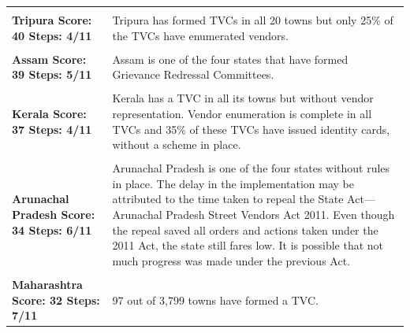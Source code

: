 \documentclass[a4paper, 12pt, twoside, table]{article}
\begin{document}
{\begin{longtable}[l]{>{\raggedright}p{3cm}>{\raggedright\arraybackslash}p{12cm}}
\cellcolor{SVACyellow1} & \cellcolor{SVACyellow2} \\

\cellcolor{SVACyellow1}\bf{Tripura}
\newline
\bf{Score: 40}
\newline
\bf{Steps: 4/11} & \cellcolor{SVACyellow2}Tripura has formed TVCs in all 20 towns but only 25\% of the TVCs have enumerated vendors. \\

\cellcolor{SVACyellow1} & \cellcolor{SVACyellow2} \\

\cellcolor{SVACyellow1}\bf{Assam}
\newline
\bf{Score: 39}
\newline
\bf{Steps: 5/11} & \cellcolor{SVACyellow2}Assam is one of the four states that have formed Grievance Redressal Committees. \\

\cellcolor{SVACyellow1} & \cellcolor{SVACyellow2} \\

\cellcolor{SVACyellow1}\bf{Kerala}
\newline
\bf{Score: 37}
\newline
\bf{Steps: 4/11} & \cellcolor{SVACyellow2}Kerala has a TVC in all its towns but without vendor representation. Vendor enumeration is complete in all TVCs and 35\% of these TVCs have issued identity cards, without a scheme in place. \\

\cellcolor{SVACyellow1} & \cellcolor{SVACyellow2} \\

\cellcolor{SVACyellow1}\bf{Arunachal Pradesh}
\newline
\bf{Score: 34}
\newline
\bf{Steps: 6/11} & \cellcolor{SVACyellow2}Arunachal Pradesh is one of the four states without rules in place. The delay in the implementation may be attributed to the time taken to repeal the State Act---Arunachal Pradesh Street Vendors Act 2011. Even though the repeal saved all orders and actions taken under the 2011 Act, the state still fares low. It is possible that not much progress was made under the previous Act. \\

\cellcolor{SVACyellow1} & \cellcolor{SVACyellow2} \\

\cellcolor{SVACyellow1}\bf{Maharashtra}
\newline
\bf{Score: 32}
\newline
\bf{Steps: 7/11} & \cellcolor{SVACyellow2}97 out of 3,799 towns have formed a TVC. \\


\end{longtable}}
\end{document}
